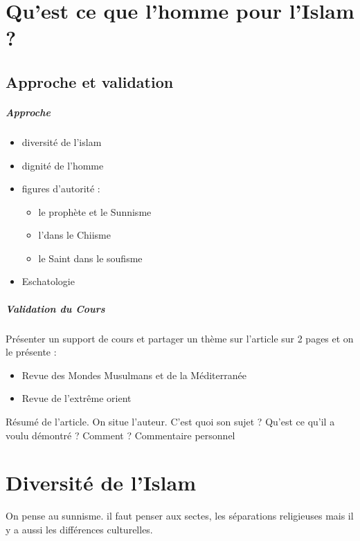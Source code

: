 \chapter{Qu'est ce que l'homme pour l'Islam ?}
\section{Approche et validation}

\paragraph{Approche}
\begin{itemize}
\item diversité de l'islam
\item dignité de l'homme
\item figures d'autorité : 
\begin{itemize}
\item le prophète et le Sunnisme
\item l'\imam dans le Chiisme
\item le Saint dans le soufisme
\end{itemize}
\item Eschatologie
\end{itemize}

\paragraph{Validation du Cours}Présenter un support de cours et partager un thème sur l'article sur 2 pages et on le présente : 
\begin{itemize}
\item Revue des Mondes Musulmans et de la Méditerranée
\item Revue de l'extrême orient
\end{itemize}
Résumé de l'article. On situe l'auteur. C'est quoi son sujet ? Qu'est ce qu'il a voulu démontré ? Comment ? 
Commentaire personnel 


\chapter{Diversité de l'Islam}

On pense au sunnisme. il faut penser aux sectes, les séparations religieuses mais il y a aussi les différences culturelles.
